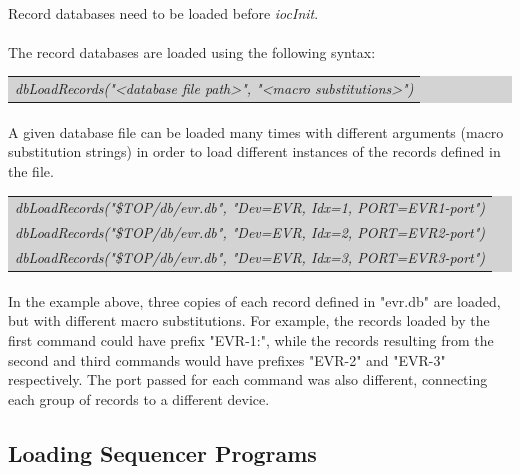 \documentclass[openany]{article}
\begin{document}
		\paragraph{} {\color{red}Record databases need to be loaded before \emph{iocInit}.}

		\paragraph{} The record databases are loaded using the following syntax:

		\bigskip
		\colorbox{lightgray}{
			\begin{tabularx}{0.9\textwidth}{X}
			\emph{dbLoadRecords("\textless database file path\textgreater", "\textless macro substitutions\textgreater")}
			\end{tabularx}
		}

		\paragraph{} A given database file can be loaded many times with different arguments (macro substitution strings) in order to load different instances of the records defined in the file.

		\bigskip
		\colorbox{lightgray}{
			\begin{tabularx}{0.9\textwidth}{X}
			\emph{dbLoadRecords("\${TOP}/db/evr.db", "Dev=EVR, Idx=1, PORT=EVR1-port")} \\
			\emph{dbLoadRecords("\${TOP}/db/evr.db", "Dev=EVR, Idx=2, PORT=EVR2-port")} \\
			\emph{dbLoadRecords("\${TOP}/db/evr.db", "Dev=EVR, Idx=3, PORT=EVR3-port")} \\
			\end{tabularx}
		}
		
		\paragraph{} In the example above, three copies of each record defined in "evr.db" are loaded, but with different macro substitutions. For example, the records loaded by the first command could have prefix "EVR-1:", while the records resulting from the second and third commands would have prefixes "EVR-2" and "EVR-3" respectively. The port passed for each command was also different, connecting each group of records to a different device.

	\subsection{Loading Sequencer Programs}
\end{document}
